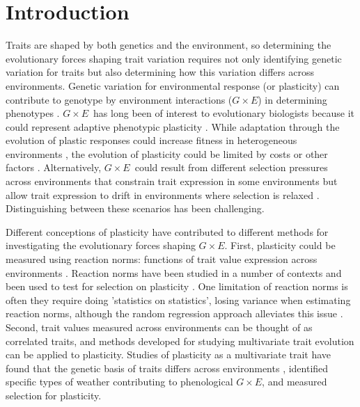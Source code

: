 \documentclass[11pt,letterpaper]{article}
\newcommand{\gxe}{$G \times E$}
\begin{document}
\section*{Introduction}

Traits are shaped by both genetics and the environment, so determining the evolutionary forces shaping trait variation requires not only identifying genetic variation for traits but also determining how this variation differs across environments.
Genetic variation for environmental response (or plasticity) can contribute to genotype by environment interactions (\gxe) in determining phenotypes \citep{falconer1952problem, bradshaw1965evolutionary}.
\gxe\ has long been of interest to evolutionary biologists because it could represent adaptive phenotypic plasticity  \citep{schlichting1986evolution,scheiner1993genetics}.
While adaptation through the evolution of plastic responses could increase fitness in heterogeneous environments \citep{van1991evolution, baythavong2011linking, anderson2021selection}, the evolution of plasticity could be limited by costs or other factors \citep{dewitt1998costs, callahan2005plasticity, roberts2023weaker}.
Alternatively, \gxe\ could result from different selection pressures across environments that constrain trait expression in some environments but allow trait expression to drift in environments where selection is relaxed \citep{paaby2014cryptic}.
Distinguishing between these scenarios has been challenging.

Different conceptions of plasticity have contributed to different methods for investigating the evolutionary forces shaping \gxe.
First, plasticity could be measured using reaction norms: functions of trait value expression across environments \citep{freeman1973statistical,scheiner1993genetics, morrissey2016variation, arnold2019analyse, de2025partitioning}.
Reaction norms have been studied in a number of contexts and been used to test for selection on plasticity \citep{valdes2023spring, wagner2018plasticity}.
One limitation of reaction norms is often they require doing 'statistics on statistics', losing variance when estimating reaction norms, although the random regression approach alleviates this issue \citep{arnold2019analyse}.
Second, trait values measured across environments can be thought of as correlated traits, and methods developed for studying multivariate trait evolution can be applied to plasticity.
Studies of plasticity as a multivariate trait have found that the genetic basis of traits differs across environments \citep{yan2021genetic}, identified specific types of weather contributing to phenological \gxe \citep{MacQueen_2025}, and measured selection for plasticity\citep{anderson2021selection}.
\end{document}
